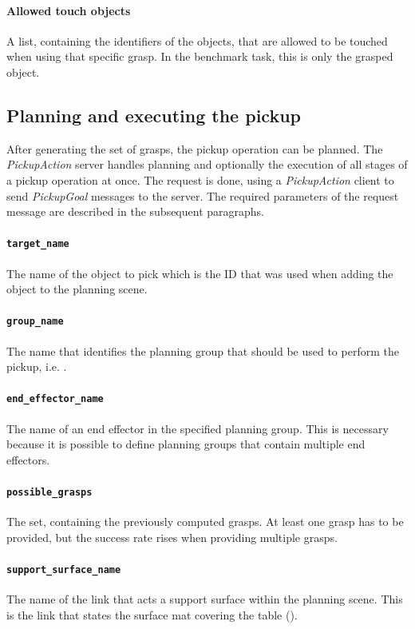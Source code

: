 \paragraph{Allowed touch objects} A list, containing the identifiers of the objects, that are allowed to be touched when using that specific grasp. In the benchmark task, this is only the grasped object.

\subsection{Planning and executing the pickup}

After generating the set of grasps, the pickup operation can be planned. The \emph{PickupAction} server handles planning and optionally the execution of all stages of a pickup operation at once. The request is done, using a \emph{PickupAction} client to send \emph{PickupGoal} messages to the server. The required parameters of the request message are described in the subsequent paragraphs.

\paragraph{\texttt{target\_name}} The name of the object to pick which is the ID that was used when adding the object to the planning scene.
\paragraph{\texttt{group\_name}} The name that identifies the planning group that should be used to perform the pickup, i.e. .
\paragraph{\texttt{end\_effector\_name}} The name of an end effector in the specified planning group. This is necessary because it is possible to define planning groups that contain multiple end effectors.
\paragraph{\texttt{possible\_grasps}} The set, containing the previously computed grasps. At least one grasp has to be provided, but the success rate rises when providing multiple grasps.
\paragraph{\texttt{support\_surface\_name}} The name of the link that acts a support surface within the planning scene. This is the link that states the surface mat covering the table (). 
